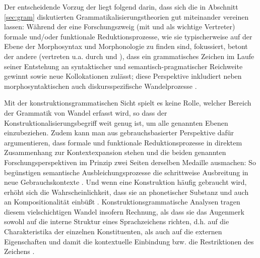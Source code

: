 Der entscheidende Vorzug der  liegt \textcite[60--62]{Traugott2015} folgend darin, dass sich die in Abschnitt \ref{sec:gram}  diskutierten Grammatikalisierungstheorien gut miteinander vereinen lassen: Während der eine Forschungszweig (mit \citealt{Lehmann1995} und \citealt{Haspelmath2004} als wichtige Vertreter) formale und/\-oder funktionale Reduktionsprozesse, wie sie typischerweise auf der Ebene der Morphosyntax und Morphonologie zu finden sind, fokussiert, betont der andere (vertreten u.a. durch \citealt{Himmelmann2004} und \citealt{Croft2006}), dass ein grammatisches Zeichen im Laufe seiner Entstehung an syntaktischer und semantisch-pragmatischer Reichweite gewinnt sowie neue Kollokationen zulässt; diese Perspektive inkludiert neben morphosyntaktischen auch diskursspezifische Wandelprozesse \parencite[vgl. den Begriff der  für die Entwicklung von Diskursmarkern bei][]{Auer2005}. 

Mit der konstruktionsgrammatischen Sicht spielt es keine Rolle, welcher Bereich der Grammatik von Wandel erfasst wird, so dass der Konstruktionalisierungsbegriff weit genug ist, um alle genannten Ebenen einzubeziehen. Zudem kann man aus gebrauchsbasierter Perspektive dafür argumentieren, dass formale und funktionale Reduktionsprozesse in direktem Zusammenhang zur Kontextexpansion  stehen und die beiden genannten Forschungsperspektiven im Prinzip zwei Seiten derselben Medaille ausmachen: So begünstigen semantische Ausbleichungsprozesse die schrittweise Ausbreitung in neue Gebrauchskontexte \parencite[61]{Traugott2015}. Und wenn eine Konstruktion  häufig gebraucht wird, erhöht sich die Wahrscheinlichkeit, dass sie an phonetischer Substanz und auch an Kompositionalität einbüßt \parencite[20]{Bybee2010}.  Konstruktionsgrammatische Analysen tragen diesem vielschichtigen Wandel insofern Rechnung, als dass sie das Augenmerk sowohl auf die interne Struktur eines Sprachzeichens richten, d.h. auf die Charakteristika der einzelnen Konstituenten, als auch auf die externen Eigenschaften und damit die kontextuelle Einbindung bzw. die Restriktionen des Zeichens  \parencite[zu diesem externen/internen Kontrast s. weiterführend][]{Fried2013}.  


